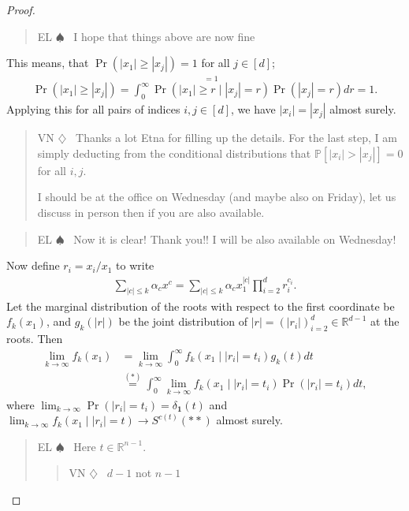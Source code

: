 \documentclass[12pt]{article}
\def\P{\mathbb{P}}
\def\R{\mathbb{R}}
\newenvironment{vn}{\begin{quote}\color{myviolet} \small\sf VN $\diamondsuit$~}{\end{quote}}
\newenvironment{el}{\begin{quote}\color{amethyst} \small\sf EL $\spadesuit$~}{\end{quote}}
\begin{document}
\begin{proof}
    \begin{el}
        I hope that things above are now fine
    \end{el}

    This means, that $\Pr(|x_1| \geq |x_j|) = 1$ for all $j \in [d]$;
    \begin{align*}
       \Pr(|x_1|\geq |x_j|) = \int_0^\infty \stackrel{= 1}{\Pr(|x_1| \geq r \mid |x_j| = r)} \Pr(|x_j| = r) dr = 1. 
    \end{align*}
    Applying this for all pairs of indices $i,j \in [d]$, we have $|x_i| = |x_j|$ almost surely.
    
    
    \begin{vn}
    Thanks a lot Etna for filling up the details. For the last step, I am simply deducting from the conditional distributions that $\P[|x_i|>|x_j|]=0$ for all $i,j$.

    I should be at the office on Wednesday (and maybe also on Friday), let us discuss in person then if you are also available.
    \end{vn}
    
    \begin{el}
        Now it is clear! Thank you!! I will be also available on Wednesday!
    \end{el}

    
    Now define $r_i = x_i/x_1$ to write
    \begin{align*}
        \sum_{|c| \leq k} \alpha_c x^c =  \sum_{|c| \leq k} \alpha_c x_1^{|c|} \prod_{i=2}^d r_i^{c_i}.
    \end{align*}
    Let the marginal distribution of the roots with respect to the first coordinate be $f_k(x_1)$, and $g_k(|r|)$ be the joint distribution of $|r| = (|r_i|)_{i=2}^d \in \R^{d-1}$ at the roots. Then
    \begin{align*}
        \lim_{k\to \infty} f_k(x_1) &= \lim_{k\to \infty} \int_0^\infty f_k(x_1 \mid |r_i| = t_i) g_k( t) dt \\ 
        &\stackrel{(*)}{=} \int_0^\infty \lim_{k\to \infty}  f_k(x_1 \mid |r_i| = t_i) \Pr(|r_i| = t_i) dt,
    \end{align*}
    where $\lim_{k\to \infty} \Pr(|r_i| = t_i) = \delta_{\mathbf{1}}(t)$ and $\lim_{k\to \infty} f_k(x_1 \mid |r_i| = t) \to S^{c(t)} (**)$ almost surely. 
     
    
    
    \begin{el}
       Here $t \in \R^{n-1}$.

       \begin{vn}
           $d-1$ not $n-1$
       \end{vn}


\end{el}
\end{proof}
\end{document}
